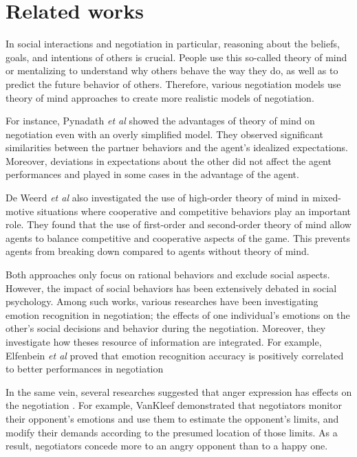 \documentclass[conference, letterpaper]{IEEEtran}
\begin{document}
\section{Related works}

In social interactions and negotiation in particular, reasoning about the beliefs, goals, and intentions of others is crucial. People use this so-called theory of mind \cite{premack1978does} or mentalizing to understand why others behave the way they do, as well as to predict the future behavior of others. Therefore, various negotiation models use theory of mind approaches to create  more realistic models of negotiation. 

For instance, Pynadath \textit{et al}\cite{pynadath2013you} showed the advantages of theory of mind on negotiation even with an overly simplified model. They observed significant similarities between	the partner behaviors and the agent's idealized expectations. Moreover, deviations in expectations about the other did not affect the agent performances and played in some cases in the advantage of the agent.

De Weerd \textit{et al} \cite{de2013higher} also investigated the use of high-order theory of mind in mixed-motive situations where cooperative and competitive behaviors play an important role. They found that the use of first-order and second-order theory of mind allow agents to balance competitive and cooperative	aspects of the game. This prevents agents from breaking down compared to  agents without theory of mind.


Both approaches only focus on rational behaviors and exclude social aspects. However, the impact of social behaviors has been extensively debated in social psychology. Among such works, various researches have been investigating emotion recognition in negotiation; the effects of one individual's	emotions on the other's social decisions and behavior during the negotiation. Moreover, they investigate how theses resource of information are integrated.
For example, Elfenbein\textit{ et al} \cite{elfenbein2007reading} proved that  emotion recognition accuracy is positively correlated to  better performances in negotiation

In the same vein, several researches suggested that anger expression has effects on the negotiation \cite{sinaceur2006get,van2010interpersonal,ferguson2004social}. For example, VanKleef \cite{van2004interpersonal} demonstrated that negotiators monitor their opponent's emotions and use them to estimate the opponent's limits, and modify their demands according to the presumed location of those limits. As a result, negotiators concede more to an angry opponent than to a happy one. 
\end{document}
